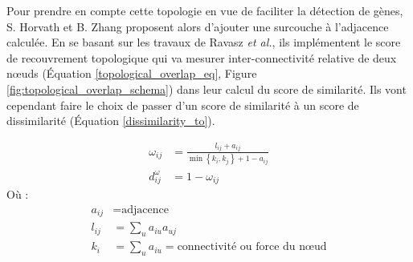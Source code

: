 
Pour prendre en compte cette topologie en vue de faciliter la détection de gènes, S. Horvath et B. Zhang proposent alors d'ajouter une surcouche à l'adjacence calculée. En se basant sur les travaux de Ravasz \textit{et al.}, ils implémentent le score de recouvrement topologique qui va mesurer inter-connectivité relative de deux nœuds (Équation \ref{topological_overlap_eq}, Figure \ref{fig:topological_overlap_schema}) dans leur calcul du score de similarité. Ils vont cependant faire le choix de passer d'un score de similarité à un score de dissimilarité (Équation \ref{dissimilarity_to}). 

\begin{align} 
    \omega_{i j} &= \frac{l_{i j}+a_{i j}}{\min \left\{k_{i}, k_{j}\right\}+1-a_{i j}} \label{topological_overlap_eq} \\ 
    d_{i j}^{\omega} &= 1-\omega_{i j} \label{dissimilarity_to}
\end{align}
Où :
\begin{align*}
    a_{i j} & = \text{adjacence} \\
    l_{i j} &= \sum_{u} a_{i u} a_{u j} \\
    k_{i} &= \sum_{u} a_{i u} = \text{connectivité ou force du nœud}
\end{align*}

